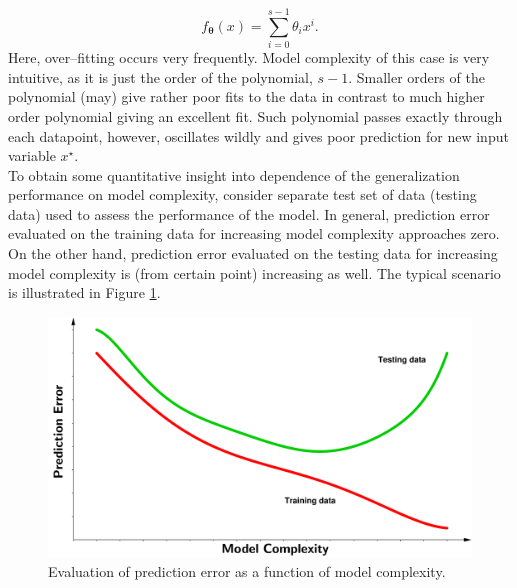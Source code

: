 \begin{equation}
	f_{\boldsymbol{\theta}}(x) = \sum_{i=0}^{s-1}\theta_ix^i.
\end{equation}
 Here, over--fitting occurs very frequently. Model complexity of this case is very intuitive, as it is just the order of the polynomial, $s-1$.  Smaller orders of the polynomial (may) give rather poor fits to the data in contrast to much higher order polynomial giving an excellent fit. Such polynomial passes exactly through each datapoint, however, oscillates wildly and gives poor prediction for new input variable $x^{\star}$. \\
To obtain some quantitative insight into dependence of the generalization performance on model complexity, consider separate test set of data (testing data) used to assess the performance of the model. 
In general, prediction error evaluated on the training data for increasing model complexity approaches zero. On the other hand, prediction error evaluated on the testing data for increasing model complexity is (from certain point) increasing as well. The typical scenario is illustrated in Figure \ref{fig:Prediction_error}.
 \begin{figure}[h]
	\centering
	\includegraphics[width=16.0cm]{plots/Images/PE3.pdf}
	\caption{Evaluation of prediction error as a function of model complexity.}%
	\label{fig:Prediction_error}%
\end{figure}


 
